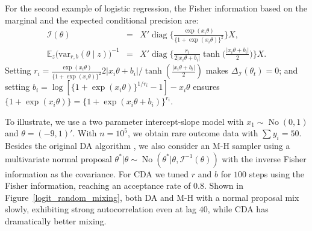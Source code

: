 \documentclass[12pt]{article}
\newcommand{\xtheta}{ x_i \theta}
\newcommand{\bb}[1]{\mathbb{#1}}
\newcommand{\mc}[1]{\mathcal{#1}}
\DeclareMathOperator{\No}{No}
\DeclareMathOperator{\diag}{diag}
\begin{document}
 
For the second example of logistic regression, the Fisher information based on the marginal and the expected conditional precision are:
 \begin{eqnarray}
\mc I(\theta) &=&  X' \diag\bigg\{\frac{\exp(\xtheta)}{ \{1+\exp(\xtheta)\} ^2}\bigg\} X, \nonumber \\
\bb E_z \big( \mbox{var}_{r,b} (\theta \mid z) \big)^{-1} &= & X'  \diag\bigg\{ \frac{r_i}{2 |\xtheta+b_i|}\tanh\Big(\frac{|\xtheta+b_i|}{2} \Big)\bigg\} X .  \nonumber
\end{eqnarray}
Setting $r_i=\frac{\exp(\xtheta)}{ \{1+\exp(\xtheta)\} ^2} {2 |\xtheta+b_i|}/ \tanh(\frac{|\xtheta+b_i|}{2})$ makes $\Delta_{\mc I}(\theta_t)=0$; and setting $b_i = \log[  \{1+\exp(\xtheta)\}^{1/r_i} -1] - \xtheta$ ensures $ \{1+\exp(\xtheta)\}  = \{1+\exp(\xtheta+b_i)\}^{r_i}$.

To illustrate, we use a two parameter intercept-slope model with $x_1\sim \No(0,1)$ and $\theta=(-9,1)'$. With $n= 10^5$, we obtain rare outcome data with 
$\sum y_{i} = 50 $.  Besides the original DA algorithm  \citep{polson2013bayesian}, we also consider an M-H sampler using a multivariate normal proposal $\theta^*|\theta \sim \No(\theta^*| \theta, {\mc I}^{-1}(\theta))$ with the inverse Fisher information as the covariance. For CDA we tuned $r$ and $b$ for $100$ steps using the Fisher information, reaching an acceptance rate of $0.8$.  Shown in Figure~\ref{logit_random_mixing}, both DA and M-H with a normal proposal mix slowly, exhibiting strong autocorrelation even at lag $40$, while CDA has dramatically better mixing.
\end{document}
